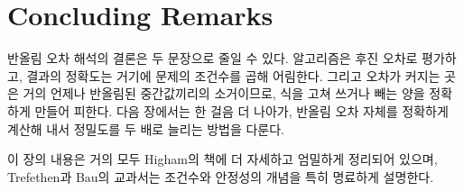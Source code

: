 \section{Concluding Remarks}

반올림 오차 해석의 결론은 두 문장으로 줄일 수 있다. 알고리즘은 후진 오차로 평가하고, 결과의 정확도는 거기에 문제의 조건수를 곱해 어림한다. 그리고 오차가 커지는 곳은 거의 언제나 반올림된 중간값끼리의 소거이므로, 식을 고쳐 쓰거나 빼는 양을 정확하게 만들어 피한다. 다음 장에서는 한 걸음 더 나아가, 반올림 오차 자체를 정확하게 계산해 내서 정밀도를 두 배로 늘리는 방법을 다룬다.

이 장의 내용은 거의 모두 Higham의 책\cite{higham2002accuracy}에 더 자세하고 엄밀하게 정리되어 있으며, Trefethen과 Bau의 교과서\cite{trefethen1997nla}는 조건수와 안정성의 개념을 특히 명료하게 설명한다.

\chapterreferences
